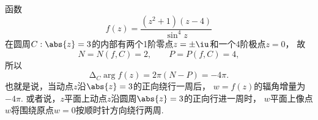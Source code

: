 \begin{example}
函数\begin{equation*}
	f(z) = \frac{(z^2+1)(z-4)}{\sin^4 z}
\end{equation*}
在圆周\(C: \abs{z}=3\)的内部有两个1阶零点\(z=\pm\iu\)和一个4阶极点\(z=0\)，
故\begin{equation*}
	N=N(f,C)=2, \qquad P=P(f,C)=4,
\end{equation*}
所以\begin{equation*}
	\increment_C \arg f(z) = 2\pi(N - P) = -4\pi.
\end{equation*}
也就是说，当动点\(z\)沿\(\abs{z}=3\)的正向绕行一周后，
\(w = f(z)\)的辐角增量为\(-4\pi\).
或者说，\(z\)平面上动点\(z\)沿圆周\(\abs{z}=3\)的正向行进一周时，
\(w\)平面上像点\(w\)将围绕原点\(w=0\)按顺时针方向绕行两周.
\end{example}

